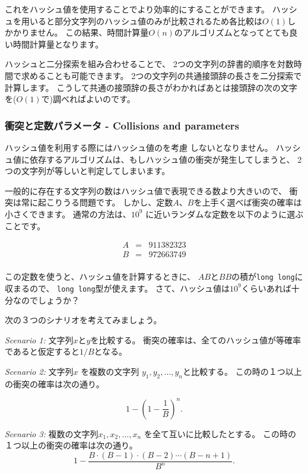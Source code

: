 これをハッシュ値を使用することでより効率的にすることができます。
ハッシュを用いると部分文字列のハッシュ値のみが比較されるため各比較は$O(1)$しかかりません。
この結果、時間計算量$O(n)$のアルゴリズムとなってとても良い時間計算量となります。

ハッシュと二分探索を組み合わせることで、
2つの文字列の辞書的順序を対数時間で求めることも可能できます。
2つの文字列の共通接頭辞の長さを二分探索で計算します。
こうして共通の接頭辞の長さがわかればあとは接頭辞の次の文字を($O(1)$で)調べればよいのです。

\subsubsection*{衝突と定数パラメータ - Collisions and parameters}


ハッシュ値を利用する際にはハッシュ値のを考慮
しないとなりません。
ハッシュ値に依存するアルゴリズムは、もしハッシュ値の衝突が発生してしまうと、
2つの文字列が等しいと判定してしまいます。

一般的に存在する文字列の数はハッシュ値で表現できる数より大きいので、
衝突は常に起こりうる問題です。
しかし、定数$A$、$B$を上手く選べば衝突の確率は小さくできます。
通常の方法は、$10^9$ に近いランダムな定数を以下のように選ぶことです。

\[
\begin{array}{lcl}
A & = & 911382323 \\
B & = & 972663749 \\
\end{array}
\]

この定数を使うと、ハッシュ値を計算するときに、
$AB$と$BB$の積が\texttt{long long}に収まるので、
\texttt{long long}型が使えます。
さて、ハッシュ値は$10^9$くらいあれば十分なのでしょうか？

次の３つのシナリオを考えてみましょう。

\textit{Scenario 1:} 文字列$x$と$y$を比較する。
衝突の確率は、全てのハッシュ値が等確率であると仮定すると$1/B$となる。

\textit{Scenario 2:} 文字列$x$ を複数の文字列
$y_1,y_2,\ldots,y_n$と比較する。
この時の１つ以上の衝突の確率は次の通り。

\[1-(1-\frac{1}{B})^n.\]

\textit{Scenario 3:} 複数の文字列$x_1,x_2,\ldots,x_n$
を全て互いに比較したとする。
この時の１つ以上の衝突の確率は次の通り。
\[ 1 - \frac{B \cdot (B-1) \cdot (B-2) \cdots (B-n+1)}{B^n}.\]

